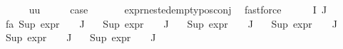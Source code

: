 \begin{isabellebody}
\isanewline
\ \ \isamarkupfalse%
\ {\isacharparenleft}{\kern0pt}{}\ {\isasympsi}\ uu{\isacharparenright}{\kern0pt}\isanewline
\ \ \isamarkupfalse%
\ \isamarkupfalse%
\ {\isacharquery}{\kern0pt}case\ \isanewline
\ \ \ \ \isamarkupfalse%
\ expr{\isacharunderscore}{\kern0pt}nested{\isacharunderscore}{\kern0pt}empty{\isacharunderscore}{\kern0pt}pos{\isacharunderscore}{\kern0pt}conj\ \isamarkupfalse%
\ fastforce\isanewline
{}\isamarkupfalse%
\isanewline
\ \ \isamarkupfalse%
\ {\isacharparenleft}{\kern0pt}{}\ {\isasymPhi}\ I\ J{\isacharparenright}{\kern0pt}\isanewline
\ \ \isamarkupfalse%
\ {}\ \isamarkupfalse%
\ fa{\isacharunderscore}{\kern0pt}{\isasympsi}{\isacharcolon}{\kern0pt}\ {\isachardoublequoteopen}Sup\ {\isacharparenleft}{\kern0pt}{\isacharparenleft}{\kern0pt}expr{\isacharunderscore}{\kern0pt}{}\ {\isasymcirc}\ {\isasymPhi}{\isacharparenright}{\kern0pt}\ {\isacharbackquote}{\kern0pt}\ J{\isacharparenright}{\kern0pt}\ {\isasymle}\ {}{\isachardoublequoteclose}\isanewline
\ {\isachardoublequoteopen}Sup\ {\isacharparenleft}{\kern0pt}{\isacharparenleft}{\kern0pt}expr{\isacharunderscore}{\kern0pt}{}\ {\isasymcirc}\ {\isasymPhi}{\isacharparenright}{\kern0pt}\ {\isacharbackquote}{\kern0pt}\ J{\isacharparenright}{\kern0pt}\ {\isasymle}\ {}{\isachardoublequoteclose}\isanewline
\ {\isachardoublequoteopen}Sup\ {\isacharparenleft}{\kern0pt}{\isacharparenleft}{\kern0pt}expr{\isacharunderscore}{\kern0pt}{}\ {\isasymcirc}\ {\isasymPhi}{\isacharparenright}{\kern0pt}\ {\isacharbackquote}{\kern0pt}\ J{\isacharparenright}{\kern0pt}\ {\isasymle}\ {}{\isachardoublequoteclose}\isanewline
\ {\isachardoublequoteopen}Sup\ {\isacharparenleft}{\kern0pt}{\isacharparenleft}{\kern0pt}expr{\isacharunderscore}{\kern0pt}{}\ {\isasymcirc}\ {\isasymPhi}{\isacharparenright}{\kern0pt}\ {\isacharbackquote}{\kern0pt}\ J{\isacharparenright}{\kern0pt}\ {\isasymle}\ {}{\isachardoublequoteclose}\isanewline
\ {\isachardoublequoteopen}Sup\ {\isacharparenleft}{\kern0pt}{\isacharparenleft}{\kern0pt}expr{\isacharunderscore}{\kern0pt}{}\ {\isasymcirc}\ {\isasymPhi}{\isacharparenright}{\kern0pt}\ {\isacharbackquote}{\kern0pt}\ J{\isacharparenright}{\kern0pt}\ {\isasymle}\ {}{\isachardoublequoteclose}\isanewline
\ {\isachardoublequoteopen}Sup\ {\isacharparenleft}{\kern0pt}{\isacharparenleft}{\kern0pt}expr{\isacharunderscore}{\kern0pt}{}\ {\isasymcirc}\ {\isasymPhi}{\isacharparenright}{\kern0pt}\ {\isacharbackquote}{\kern0pt}\ J{\isacharparenright}{\kern0pt}\ {\isasymle}\ {}{\isachardoublequoteclose}\isanewline

\end{isabellebody}
